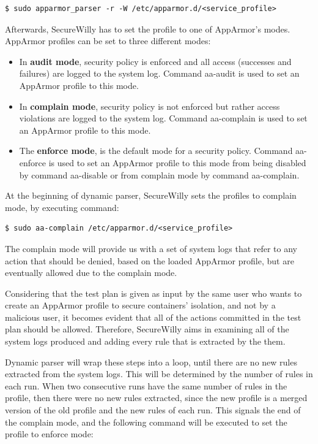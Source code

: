 \begin{lstlisting}[style=dockercommands]
$ sudo apparmor_parser -r -W /etc/apparmor.d/<service_profile>
\end{lstlisting}

Afterwards, SecureWilly has to set the profile to one of AppArmor's modes. AppArmor profiles can be set to three different modes:

\begin{itemize}
\item In \textbf{audit mode}, security policy is enforced and all access (successes and failures) are logged to the system log. Command aa-audit is used to set an AppArmor profile to this mode.
\item In \textbf{complain mode}, security policy is not enforced but rather access violations are logged to the system log. Command aa-complain is used to set an AppArmor profile to this mode.
\item The \textbf{enforce mode}, is the default mode for a security policy. Command aa-enforce is used to set an AppArmor profile to this mode from being disabled by command aa-disable or from complain mode by command aa-complain.
\end{itemize}

At the beginning of dynamic parser, SecureWilly sets the profiles to complain mode, by executing command:
\begin{lstlisting}[style=dockercommands]
$ sudo aa-complain /etc/apparmor.d/<service_profile>
\end{lstlisting}

The complain mode will provide us with a set of system logs that refer to any action that should be denied, based on the loaded AppArmor profile, but are eventually allowed due to the complain mode.

Considering that the test plan is given as input by the same user who wants to create an AppArmor profile to secure containers' isolation, and not by a malicious user, it becomes evident that all of the actions committed in the test plan should be allowed. Therefore, SecureWilly aims in examining all of the system logs produced and adding every rule that is extracted by the them.

Dynamic parser will wrap these steps into a loop, until there are no new rules extracted from the system logs. This will be determined by the number of rules in each run. When two consecutive runs have the same number of rules in the profile, then there were no new rules extracted, since the new profile is a merged version of the old profile and the new rules of each run. This signals the end of the complain mode, and the following command will be executed to set the profile to enforce mode:

